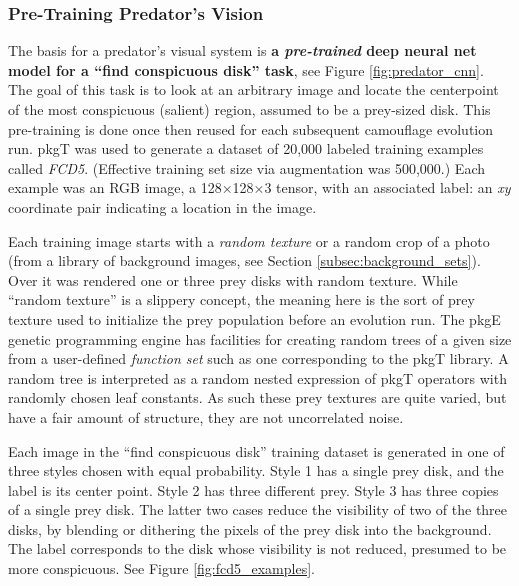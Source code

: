 \documentclass[acmtog]{acmart}
\newcommand{\jargon}[1]{\textit{#1}}
\newcommand{\texsyn}[0]{pkgT}
\newcommand{\lazypredator}[0]{pkgE}
\begin{document}
\subsubsection{Pre-Training Predator's Vision}
\label{sec:pre_train_predator}
The basis for a predator's visual system is \textbf{a \jargon{pre-trained} deep neural net model for a “find conspicuous disk” task}, see Figure \ref{fig:predator_cnn}. The goal of this task is to look at an arbitrary image and locate the centerpoint of the most conspicuous (salient) region, assumed to be a prey-sized disk. This pre-training is done once then reused for each subsequent camouflage evolution run. \texsyn{} was used to generate a dataset of 20,000 labeled training examples called \jargon{FCD5}. (Effective training set size via augmentation was 500,000.) Each example was an RGB image, a 128×128×3 tensor, with an associated label: an \textit{xy} coordinate pair indicating a location in the image.
\par
Each training image starts with a \jargon{random texture} or a random crop of a photo (from a library of background images, see Section \ref{subsec:background_sets}). Over it was rendered one or three prey disks with random texture. While “random texture” is a slippery concept, the meaning here is the sort of prey texture used to initialize the prey population before an evolution run. The \lazypredator{} genetic programming engine has facilities for creating random trees of a given size from a user-defined \jargon{function set} such as one corresponding to the \texsyn{} library. A random tree is interpreted as a random nested expression of \texsyn{} operators with randomly chosen leaf constants. As such these prey textures are quite varied, but have a fair amount of structure, they are not uncorrelated noise.
\par
Each image in the “find conspicuous disk” training dataset is generated in one of three styles chosen with equal probability. Style 1 has a single prey disk, and the label is its center point. Style 2 has three different prey. Style 3 has three copies of a single prey disk. The latter two cases reduce the visibility of two of the three disks, by blending or dithering the pixels of the prey disk into the background. The label corresponds to the disk whose visibility is not reduced, presumed to be more conspicuous. See Figure \ref{fig:fcd5_examples}.
\par
\end{document}
